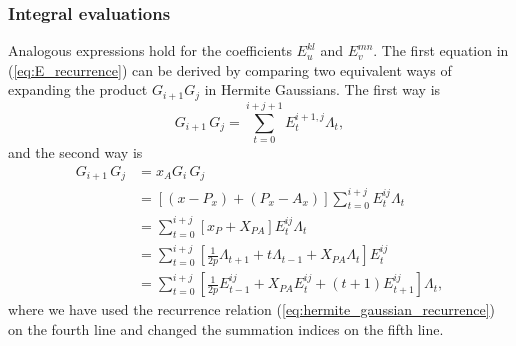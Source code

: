 {
  \frametitle{Integral evaluations}
\begin{small}
{\scriptsize
Analogous expressions hold for the coefficients $E^{kl}_u$ and $E^{mn}_v$. The first equation in (\ref{eq:E_recurrence}) 
can be derived by comparing two equivalent ways of expanding the product $G_{i+1}G_j$
in Hermite Gaussians. The first way is
\begin{equation}
 G_{i+1}\,G_j= \sum_{t=0}^{i+j+1}E^{i+1,j}_t \Lambda_t,
\end{equation}
and the second way is
\begin{equation}
\label{eq:derivation_E_coeffs}
\begin{split}
 G_{i+1}\,G_j & = x_A G_i\,G_j \\
              & = [(x - P_x) + (P_x - A_x)]\sum_{t=0}^{i+j} E^{ij}_t \Lambda_t\\
              & = \sum_{t=0}^{i+j}[x_P + X_{PA}] E^{ij}_t \Lambda_t \\
              & = \sum_{t=0}^{i+j}[\frac{1}{2p}\Lambda_{t+1} + t\Lambda_{t-1} + X_{PA}\Lambda_t]E^{ij}_t \\
              & = \sum_{t=0}^{i+j}[\frac{1}{2p}E^{ij}_{t-1} + X_{PA}E^{ij}_t + (t+1)E^{ij}_{t+1}] \Lambda_t,
\end{split}
\end{equation}
where we have used the recurrence relation (\ref{eq:hermite_gaussian_recurrence}) on the fourth line and changed the 
summation indices on the fifth line. 
}
\end{small}
}


